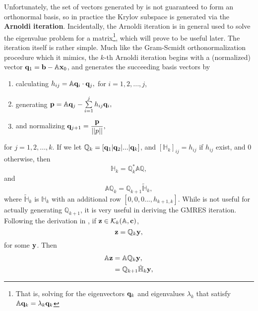 Unfortunately, the set of vectors generated by  is not guaranteed to form an orthonormal basis, so in practice the Krylov subspace is generated via the {\bf Arnoldi iteration}. Incidentally, the Arnoldi iteration is in general used to solve the eigenvalue problem for a matrix\footnote{That is, solving for the eigenvectors $\mathbf{q}_k$ and eigenvalues $\lambda_k$ that satisfy $\mathbb{A}\mathbf{q}_k = \lambda_k\mathbf{q}_k$}, which will prove to be useful later. The iteration itself is rather simple. Much like the Gram-Scmidt orthonormalization procedure which it mimics, the $k$-th Arnoldi iteration begins with a (normalized) vector $\mathbf{q}_1 = \mathbf{b} - \mathbb{A}\mathbf{x}_0$, and generates the succeeding basis vectors by 
\begin{enumerate}
  \renewcommand{\labelenumi}{\textbf{\theenumi}}
\renewcommand{\theenumi}{ARNOLDI-\arabic{enumi})}
\item calculating $h_{ij} = \mathbb{A}\mathbf{q}_{i} \cdot \mathbf{q}_j,$ for $i = 1,2,...,j$,
\item generating $\Vector{p} = \mathbb{A}\Vector{q}_j - \sum{i=1}{j}{h_{ij}\Vector{q}_i},$ 
\item and normalizing $\mathbf{q}_{j+1} = \dfrac{\mathbf{p}}{||p||},$
\end{enumerate}
for $j = 1,2,...,k$. If we let $\mathbb{Q}_k = [ \mathbf{q}_1| \mathbf{q}_2 | ... |\mathbf{q}_k ]$, and $[\mathbb{H}_k]_{ij} = h_{ij}$ if $h_{ij}$ exist, and $0$ otherwise, then 
\begin{equation}
\mathbb{H}_k = \mathbb{Q}_k^* \mathbb{A}\mathbb{Q},
\end{equation}
and 
\begin{equation}\label{eq:Qiter}
\mathbb{A}\mathbb{Q}_k = \mathbb{Q}_{k+1}\mathbb{\tilde{H}}_k,
\end{equation}
where $\mathbb{\tilde{H}}_k$ is $\mathbb{H}_k$ with an additional row $[0,0,0...,h_{k+1,k}]$. While  is not useful for actually generating $\mathbb{Q}_{k+1}$, it is very useful in deriving the GMRES iteration. Following the derivation in , if $\mathbf{z} \in \mathcal{K}_k(\mathbb{A},\mathbf{c})$, 
\begin{equation}
\mathbf{z} = \mathbb{Q}_k \mathbf{y},
\end{equation}
for some $\mathbf{y}$. Then 
\begin{align}
\begin{split}
\mathbb{A}\mathbf{z} &= \mathbb{A}\mathbb{Q}_{k}\mathbf{y},\\
				&= \mathbb{Q}_{k+1}\mathbb{\tilde{H}}_{k}\mathbf{y},
\end{split}
\end{align}
